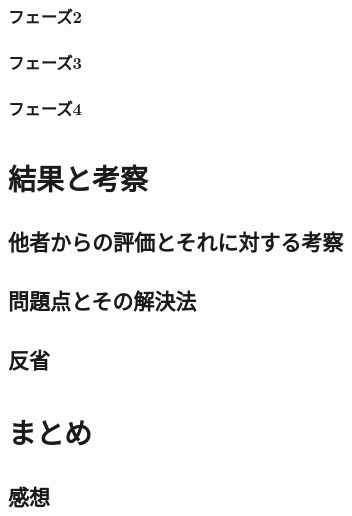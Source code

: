 \documentclass[a4paper,titlepage,11pt]{ltjsarticle}
\begin{document}
\subsubsection{フェーズ2}
\subsubsection{フェーズ3}
\subsubsection{フェーズ4}
\section{結果と考察}
\subsection{他者からの評価とそれに対する考察}
\subsection{問題点とその解決法}
\subsection{反省}
\section{まとめ}
\subsection{感想}
\end{document}
